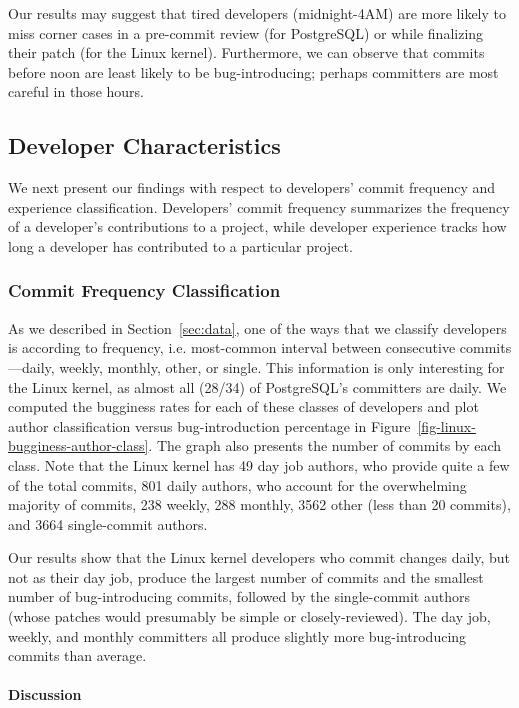 Our results may suggest that tired developers (midnight-4AM) are more likely to
miss corner cases in a pre-commit review (for PostgreSQL) or while finalizing
their patch (for the Linux kernel). Furthermore, we can observe that commits
before noon are least likely to be bug-introducing; perhaps committers are most
careful in those hours.

\subsection{Developer Characteristics}
\label{sec-dev-char}

We next present our findings with respect to developers' commit frequency and
experience classification. Developers' commit frequency summarizes the frequency
of a developer's contributions to a project, while developer experience tracks
how long a developer has contributed to a particular project.

\subsubsection{Commit Frequency Classification} 

As we described in Section~\ref{sec:data}, one of the ways that we classify
developers is according to frequency, i.e. most-common interval between
consecutive commits---daily, weekly, monthly, other, or single.  This
information is only interesting for the Linux kernel, as almost all (28/34) of
PostgreSQL's committers are daily. We computed the bugginess rates for each of
these classes of developers and plot author classification versus
bug-introduction percentage in
Figure~\ref{fig-linux-bugginess-author-class}. The graph also presents the
number of commits by each class. Note that the Linux kernel has 49 day job
authors, who provide quite a few of the total commits, 801 daily authors, who
account for the overwhelming majority of commits, 238 weekly, 288 monthly, 3562
other (less than 20 commits), and 3664 single-commit authors.

Our results show that the Linux kernel developers who commit changes daily, but
not as their day job, produce the largest number of commits and the smallest
number of bug-introducing commits, followed by the single-commit authors (whose
patches would presumably be simple or closely-reviewed). The day job, weekly,
and monthly committers all produce slightly more bug-introducing commits than
average.

\paragraph{Discussion}

